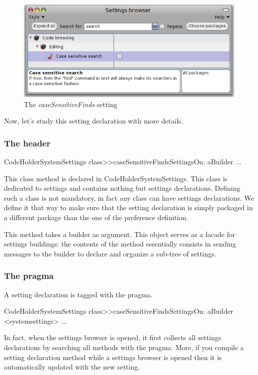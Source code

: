 \documentclass[a4paper,10pt,twoside]{book}
\begin{document}
\begin{figure}[tbh]
\begin{center}
\includegraphics[scale=0.4]{caseSensitiveFinds_setting_declaration1}
\caption{The \textit{caseSensitiveFinds} setting}
\end{center}
\end{figure}

Now, let's study this setting declaration with more details. 

\subsubsection{The header}
\begin{code}{}
CodeHolderSystemSettings class>>caseSensitiveFindsSettingsOn: aBuilder
...
\end{code}
This class method is declared in CodeHolderSystemSettings. This class is dedicated to settings and contains nothing but settings declarations. Defining such a class is not mandatory, in fact any class can have settings declarations. We define it that way to make sure that the setting declaration is simply packaged in a different package than the one of the preference definition.

This method takes a builder as argument. This object serves as a facade for settings buildings: the contents of the method essentially consists in sending messages to the builder to declare and organize a sub-tree of settings.

\subsubsection{The pragma}
A setting declaration is tagged with the  pragma.
\begin{code}{}
CodeHolderSystemSettings class>>caseSensitiveFindsSettingsOn: aBuilder
	<systemsettings>
...
\end{code}
In fact, when the settings browser is opened, it first collects all settings declarations by searching all methods with the  pragma. More, if you compile a setting declaration method while a settings browser is opened then it is automatically updated with the new setting. 
\end{document}
